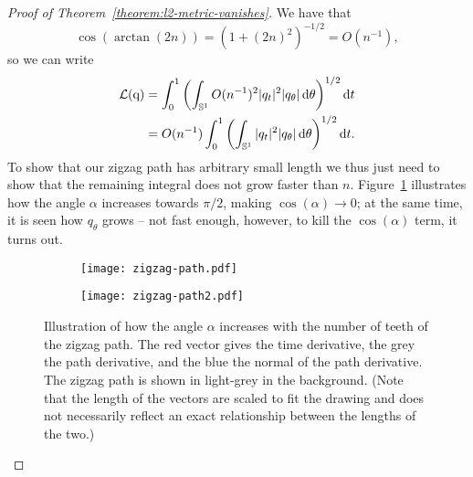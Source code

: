 \begin{proof}[Proof of Theorem~\ref{theorem:l2-metric-vanishes}]
  We have that
  \begin{equation*}
    \cos(\arctan(2n)) = (1+(2n)^2)^{-1/2}
    = O(n^{-1}),
  \end{equation*}
  so we can write
  \begin{equation}
    \label{eq:approx-L-angle}
    \begin{aligned}
    \mathcal{L}( \mathrm{q} )
    & =
      \int_{0}^{1}
      \left(
      \int_{\mathbb{S}^{1}}
      O(n^{-1})^2
      | q _t|^2   | q _{\theta}|
      \mathop{}\!\mathrm{d} \theta
      \right)^{1/2} \mathop{}\!\mathrm{d} t \\
    & =
      O(n^{-1})
      \int_{0}^{1}
      \left(
      \int_{\mathbb{S}^{1}}
      | q _t|^2   | q _{\theta}|
      \mathop{}\!\mathrm{d} \theta
      \right)^{1/2} \mathop{}\!\mathrm{d} t.
    \end{aligned}
  \end{equation}
  To show that our zigzag path has arbitrary small length we thus just need to show that the remaining integral does not grow faster than $n$. Figure~\ref{fig:zigzag-path-angle} illustrates how the angle $\alpha$ increases towards $\pi/2$, making $\cos(\alpha) \rightarrow 0$; at the same time, it is seen how $q_{\theta}$ grows -- not fast enough, however, to kill the $\cos(\alpha)$ term, it turns out.

\begin{figure}
  \centering
  \begin{subfigure}{.49\textwidth}
    \centering
    \texttt{[image: zigzag-path.pdf]}
  \end{subfigure}
  \begin{subfigure}{.49\textwidth}
    \centering
    \texttt{[image: zigzag-path2.pdf]}
  \end{subfigure}
  \caption{Illustration of how the angle $\alpha$ increases with the number of teeth of the zigzag path. The red vector gives the time derivative, the grey the path derivative, and the blue the normal of the path derivative. The zigzag path is shown in light-grey in the background. (Note that the length of the vectors are scaled to fit the drawing and does not necessarily reflect an exact relationship between the lengths of the two.)}
  \label{fig:zigzag-path-angle}
\end{figure}


\end{proof}
